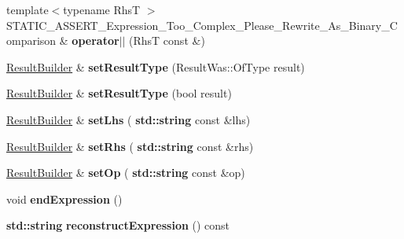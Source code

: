 \begin{DoxyCompactItemize}
\item 
\mbox{\label{class_catch_1_1_result_builder_ad489243e89e9f0ec3cb1f95392a537de}} 
{\footnotesize template$<$typename RhsT $>$ }\\S\+T\+A\+T\+I\+C\+\_\+\+A\+S\+S\+E\+R\+T\+\_\+\+Expression\+\_\+\+Too\+\_\+\+Complex\+\_\+\+Please\+\_\+\+Rewrite\+\_\+\+As\+\_\+\+Binary\+\_\+\+Comparison \& {\bfseries operator$\vert$$\vert$} (RhsT const \&)
\item 
\mbox{\label{class_catch_1_1_result_builder_af896e372db9d7fc90ddeceff3ad110d0}} 
\hyperlink{class_catch_1_1_result_builder}{Result\+Builder} \& {\bfseries set\+Result\+Type} (Result\+Was\+::\+Of\+Type result)
\item 
\mbox{\label{class_catch_1_1_result_builder_ae504348b073d0360bfd5fc33347ec689}} 
\hyperlink{class_catch_1_1_result_builder}{Result\+Builder} \& {\bfseries set\+Result\+Type} (bool result)
\item 
\mbox{\label{class_catch_1_1_result_builder_a5de584deec90fc6b7cc5bcf9eb636442}} 
\hyperlink{class_catch_1_1_result_builder}{Result\+Builder} \& {\bfseries set\+Lhs} (\textbf{ std\+::string} const \&lhs)
\item 
\mbox{\label{class_catch_1_1_result_builder_aaeb41a00cf352c7a0bcf75a0ded0a4a2}} 
\hyperlink{class_catch_1_1_result_builder}{Result\+Builder} \& {\bfseries set\+Rhs} (\textbf{ std\+::string} const \&rhs)
\item 
\mbox{\label{class_catch_1_1_result_builder_a8232ed051ed7f6adfbc152c98aa1dc0c}} 
\hyperlink{class_catch_1_1_result_builder}{Result\+Builder} \& {\bfseries set\+Op} (\textbf{ std\+::string} const \&op)
\item 
\mbox{\label{class_catch_1_1_result_builder_a75ac2dbabd8d4b4b3a75de9bbc3abf02}} 
void {\bfseries end\+Expression} ()
\item 
\mbox{\label{class_catch_1_1_result_builder_aebe098f8d206a89995076b95a3348195}} 
\textbf{ std\+::string} {\bfseries reconstruct\+Expression} () const

\end{DoxyCompactItemize}
